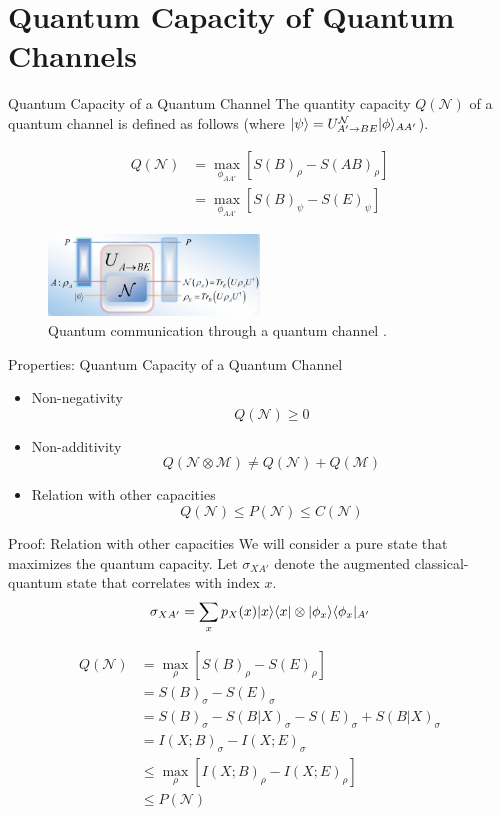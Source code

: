 \section{Quantum Capacity of Quantum Channels}

\begin{frame}{Quantum Capacity of a Quantum Channel}
The quantity capacity $Q(\mathcal{N})$ of a quantum channel is defined as follows (where $\lvert\psi\rangle = U^{\mathcal{N}}_{A' \rightarrow BE} \lvert\phi\rangle_{AA'}$).
\begin{tcolorbox}
\begin{align*}
Q(\mathcal{N}) &= \max_{\phi_{AA'}} \left[ S(B)_\rho - S(AB)_\rho \right] \\
&= \max_{\phi_{AA'}} \left[ S(B)_\psi - S(E)_\psi \right]
\end{align*}
\end{tcolorbox}

\begin{figure}
    \includegraphics[width=0.5\textwidth]{figures/quantum_communication_quantum_channel.png}
    \caption{Quantum communication through a quantum channel \cite{Gyongyosi_2018}.}
\end{figure}
\end{frame}

\begin{frame}{Properties: Quantum Capacity of a Quantum Channel}
\begin{itemize}
    \setlength{\itemsep}{1.5em}
    \item Non-negativity
    $$Q(\mathcal{N}) \geq 0$$
    \item Non-additivity
    $$Q(\mathcal{N} \otimes \mathcal{M}) \neq Q(\mathcal{N}) + Q(\mathcal{M})$$
    \item Relation with other capacities
    $$Q(\mathcal{N}) \leq P(\mathcal{N}) \leq C(\mathcal{N})$$
\end{itemize}
\end{frame}

\begin{frame}{Proof: Relation with other capacities}
We will consider a pure state that maximizes the quantum capacity. Let $\sigma_{XA'}$ denote the augmented classical-quantum state that correlates with index $x$.
$$\sigma_{XA'} = \sum_{x} p_X(x) \lvert x\rangle\langle x\rvert \otimes \lvert\phi_x\rangle\langle\phi_x\rvert_{A'}$$

\begin{align*}
Q(\mathcal{N}) &= \max_{\rho} \left[ S(B)_{\rho} - S(E)_{\rho} \right] \\
&= S(B)_{\sigma} - S(E)_{\sigma}\\
&= S(B)_{\sigma} - S(B|X)_{\sigma} - S(E)_{\sigma} + S(B|X)_{\sigma}\\
&= I(X;B)_{\sigma} - I(X;E)_{\sigma} \\
&\leq \max_{\rho} \left[ I(X;B)_{\rho} - I(X;E)_{\rho} \right] \\
&\leq P(\mathcal{N})
\end{align*}
\end{frame}
